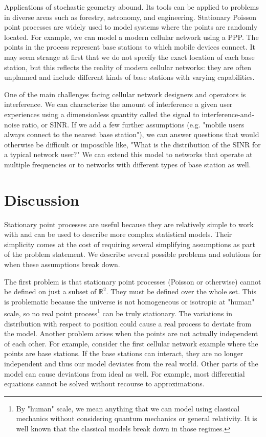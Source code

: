 \documentclass[]{article}
\begin{document}
Applications of stochastic geometry abound. Its tools can be applied to problems in diverse areas such as forestry, astronomy, and engineering. Stationary Poisson point processes are widely used to model systems where the points are randomly located. For example, we can model a modern cellular network using a PPP. The points in the process represent base stations to which mobile devices connect.  It may seem strange at first that we do not specify the exact location of each base station, but this reflects the reality of modern cellular networks: they are often unplanned and include different kinds of base stations with varying capabilities.

One of the main challenges facing cellular network designers and operators is interference. We can characterize the amount of interference a given user experiences using a dimensionless quantity called the signal to interference-and-noise ratio, or SINR. If we add a few further assumptions (e.g. "mobile users always connect to the nearest base station"), we can answer questions that would otherwise be difficult or impossible like, "What is the distribution of the SINR for a typical network user?" We can extend this model to networks that operate at multiple frequencies or to networks with different types of base station as well.

\section{Discussion}
Stationary point processes are useful because they are relatively simple to work with and can be used to describe more complex statistical models. Their simplicity comes at the cost of requiring several simplifying assumptions as part of the problem statement. We describe several possible problems and solutions for when these assumptions break down.

The first problem is that stationary point processes (Poisson or otherwise) cannot be defined on just a subset of $\mathbb{R}^2$. They must be defined over the whole set. This is problematic because the universe is not homogeneous or isotropic at "human" scale, so no real point process\footnote{By "human" scale, we mean anything that we can model using classical mechanics without considering quantum mechanics or general relativity. It is well known that the classical models break down in those regimes.} can be truly stationary. The variations in distribution with respect to position could cause a real process to deviate from the model. Another problem arises when the points are not actually independent of each other. For example, consider the first cellular network example where the points are base stations. If the base stations can interact, they are no longer independent and thus our model deviates from the real world. Other parts of the model can cause deviations from ideal as well. For example, most differential equations cannot be solved without recourse to approximations.
\end{document}
